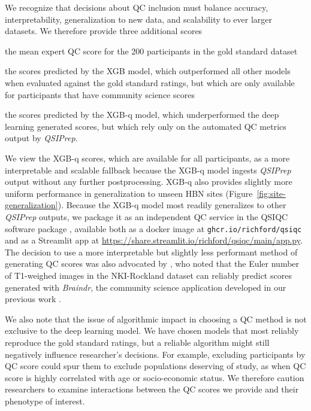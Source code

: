 \documentclass[9pt,lineno]{elife}
\begin{document}
We recognize that decisions about QC inclusion must balance accuracy, interpretability, generalization to new data, and scalability to ever larger datasets. We therefore provide three additional scores
\begin{enumerate*}[%
    label=(\roman*),%
    before=\unskip{: },%
    itemjoin={{, }},%
    itemjoin*={{, and }}]
    \item the mean expert QC score for the 200 participants in the gold standard
    dataset
    \item the scores predicted by the XGB model, which outperformed all other models
    when evaluated against the gold standard ratings, but which are only available
    for participants that have community science scores
    \item the scores predicted by the XGB-q model, which underperformed the deep
    learning generated scores, but which rely only on the automated QC metrics
    output by \emph{QSIPrep}.
\end{enumerate*}
We view the XGB-q scores, which are available for all participants, as a more interpretable and scalable fallback because the XGB-q model ingests \emph{QSIPrep} output without any further postprocessing. XGB-q also provides slightly more uniform performance in generalization to unseen HBN sites (Figure~\ref{fig:site-generalization}). Because the XGB-q model most readily generalizes to other \emph{QSIPrep} outputs, we package it as an independent QC service in the QSIQC software package \citep{richiehalford2022qsiqc}, available both as a docker image at \texttt{ghcr.io/richford/qsiqc} and as a Streamlit app at \url{https://share.streamlit.io/richford/qsiqc/main/app.py}.
The decision to use a more interpretable but slightly less
performant method of generating QC scores was also advocated by
\citep{tobe2021longitudinal}, who noted that the Euler number of T1-weighed
images \citep{rosen2018quantitative} in the NKI-Rockland dataset can reliably predict scores generated with
\emph{Braindr}, the community science application developed in our previous work
\citep{keshavan2019-er}.

We also note that the issue of algorithmic impact in choosing a QC method is not
exclusive to the deep learning model. We have chosen models that most reliably
reproduce the gold standard ratings, but a reliable algorithm might still
negatively influence researcher's decisions. For example, excluding participants
by QC score could spur them to exclude populations deserving of study, as when
QC score is highly correlated with age or socio-economic status. We therefore
caution researchers to examine interactions between the QC scores we provide and
their phenotype of interest.
\end{document}
